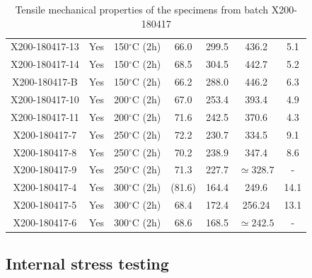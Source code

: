 \begin{center}
\begin{table}[ht]
{\begin{tabular}{|c|c|c |c |c| c|c|}
    X200-180417-13 & Yes & 150$^\circ$C (2h) & 66.0  & 299.5 & 436.2 & 5.1  \\    
    X200-180417-14 & Yes & 150$^\circ$C (2h) & 68.5 & 304.5  &442.7  & 5.2  \\    
    X200-180417-B & Yes & 150$^\circ$C (2h) & 66.2 & 288.0  & 446.2 &6.3  \\    
    X200-180417-10 & Yes & 200$^\circ$C (2h) &67.0  &253.4  & 393.4  &4.9  \\    
    X200-180417-11 & Yes & 200$^\circ$C (2h) &71.6  &242.5  &370.6  &4.3  \\    
    X200-180417-7 & Yes& 250$^\circ$C (2h) & 72.2 &230.7 & 334.5 & 9.1 \\
    X200-180417-8 & Yes& 250$^\circ$C (2h) & 70.2 & 238.9 & 347.4 & 8.6 \\
    X200-180417-9 & Yes& 250$^\circ$C (2h) & 71.3 & 227.7 &$\simeq 328.7$ & - \\
    X200-180417-4 & Yes& 300$^\circ$C (2h) & (81.6) & 164.4 & 249.6 & 14.1 \\ 
    X200-180417-5 & Yes& 300$^\circ$C (2h) & 68.4 &172.4 & 256.24 & 13.1 \\
    X200-180417-6 & Yes& 300$^\circ$C (2h) & 68.6 &168.5 & $\simeq 242.5$ & - \\

\hline
\end{tabular}}

\caption[Tensile mechanical properties of the specimens from batch X200-180417]{Tensile mechanical properties of the specimens from batch X200-180417}
\label{tab:pol}
\end{table}
 \end{center}
 
\subsection{Internal stress testing}





